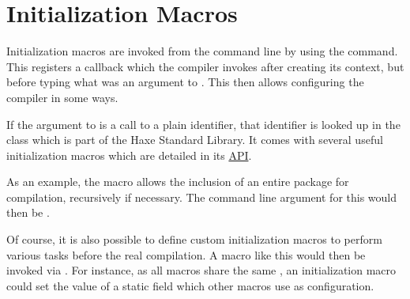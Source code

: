 \section{Initialization Macros}
\label{macro-initialization}

Initialization macros are invoked from the command line by using the  command. This registers a callback which the compiler invokes after creating its context, but before typing what was an argument to . This then allows configuring the compiler in some ways.

If the argument to  is a call to a plain identifier, that identifier is looked up in the class  which is part of the Haxe Standard Library. It comes with several useful initialization macros which are detailed in its \href{http://api.haxe.org//haxe/macro/Compiler.html}{API}.

As an example, the  macro allows the inclusion of an entire package for compilation, recursively if necessary. The command line argument for this would then be .

Of course, it is also possible to define custom initialization macros to perform various tasks before the real compilation. A macro like this would then be invoked via . For instance, as all macros share the same , an initialization macro could set the value of a static field which other macros use as configuration.
